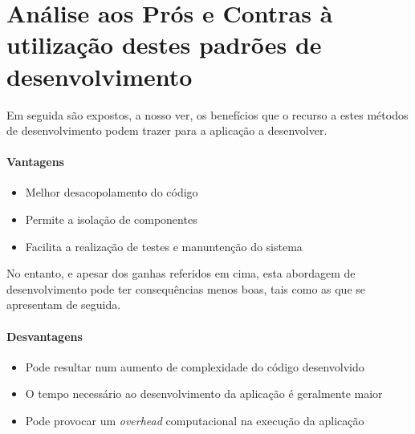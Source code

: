 \section{Análise aos Prós e Contras à utilização destes padrões de desenvolvimento}

Em seguida são expostos, a nosso ver, os benefícios que o recurso a estes métodos de desenvolvimento podem trazer para a aplicação a desenvolver.

\paragraph{Vantagens}

\begin{itemize}

	\item
	Melhor desacopolamento do código

	\item
	Permite a isolação de componentes

	\item
	Facilita a realização de testes e manuntenção do sistema

\end{itemize}

No entanto, e apesar dos ganhas referidos em cima, esta abordagem de desenvolvimento pode ter consequências menos boas, tais como as que se apresentam de seguida.

\paragraph{Desvantagens}

\begin{itemize}

	\item
	Pode resultar num aumento de complexidade do código desenvolvido

	\item
	O tempo necessário ao desenvolvimento da aplicação é geralmente maior

	\item
	Pode provocar um \textit{overhead} computacional na execução da aplicação

\end{itemize}
